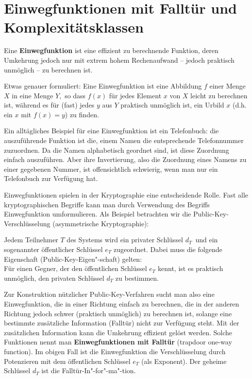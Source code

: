 \begin{refsegment}
\hypertarget{OneWayFunktion1}{}
\section{Einwegfunktionen mit Falltür und Komplexitätsklassen}
\label{OneWayFunktion1}
 
Eine \textbf{Einwegfunktion} ist eine effizient zu
berechnende Funktion, deren Umkehrung jedoch nur mit
extrem hohem Rechenaufwand -- jedoch praktisch unmöglich -- zu berechnen ist.\par

Etwas genauer formuliert:  Eine Einwegfunktion ist eine Abbildung $ f $ einer Menge $ X $ in eine Menge $ Y, $ so dass $ f(x) $ für jedes Element $ x $ von $ X $ leicht zu berechnen ist, während es für (fast) jedes $ y $ aus $ Y $  praktisch unmöglich ist, ein Urbild $ x $ (d.h. ein $ x $ mit $ f(x)=y $) zu finden.\par

Ein alltägliches Beispiel für eine Einwegfunktion ist ein Telefonbuch: die auszuführende Funktion ist die, einem Namen die entsprechende Telefonnummer zuzuordnen. Da die Namen alphabetisch geordnet sind, ist diese Zuordnung einfach auszuführen. Aber ihre Invertierung, also die Zuordnung eines Namens zu einer gegebenen Nummer, ist offensichtlich schwierig, wenn man nur ein Telefonbuch zur Verfügung hat. \par

Einwegfunktionen spielen in der Kryptographie eine entscheidende Rolle. Fast alle kryptographischen Begriffe kann man durch Verwendung des Begriffs Einwegfunktion umformulieren. Als Beispiel betrachten wir die Public-Key-Verschlüsselung  (asymmetrische Kryptographie):\par

Jedem Teilnehmer $ T $ des Systems wird ein privater 
 Schlüssel $d_T$~\mbox{und} ein sogenannter öffentlicher
Schlüssel $ e_T $ zugeordnet. Dabei muss die folgende Eigenschaft (Public-Key-Eigen"-schaft)
gelten:\\
Für einen Gegner, der den öffentlichen Schlüssel $ e_T $ kennt, ist es praktisch unmöglich,
den privaten Schlüssel  $ d_T $ zu bestimmen.\par

Zur Konstruktion nützlicher Public-Key-Verfahren sucht man also eine Einwegfunktion, die in einer Richtung \glqq einfach\grqq {} zu berechnen, die in der anderen Richtung jedoch \glqq schwer\grqq {} (praktisch unmöglich) zu berechnen ist, solange eine bestimmte zusätzliche Information  (Falltür) nicht zur Verfügung steht. Mit der zusätzlichen Information kann die Umkehrung effizient gelöst werden. Solche Funktionen nennt man \textbf{Einwegfunktionen mit Falltür} (trapdoor one-way function). Im obigen Fall ist die Einwegfunktion die Verschlüsselung durch Potenzieren mit dem öffentlichen Schl\"ussel $e_T$ (als Exponent). Der geheime Schlüssel $ d_T $ ist die Falltür-In"-for"-ma"-tion.\par


\end{refsegment}

